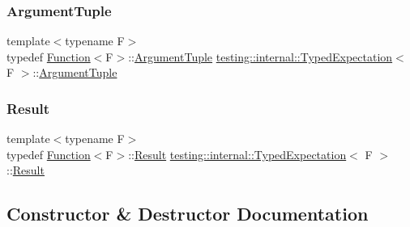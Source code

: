 \subsubsection{\texorpdfstring{Argument\+Tuple}{ArgumentTuple}}
{\footnotesize\ttfamily template$<$typename F$>$ \\
typedef \hyperlink{structtesting_1_1internal_1_1_function}{Function}$<$F$>$\+::\hyperlink{classtesting_1_1internal_1_1_typed_expectation_a9a91379262d101f435809ba4556d14fa}{Argument\+Tuple} \hyperlink{classtesting_1_1internal_1_1_typed_expectation}{testing\+::internal\+::\+Typed\+Expectation}$<$ F $>$\+::\hyperlink{classtesting_1_1internal_1_1_typed_expectation_a9a91379262d101f435809ba4556d14fa}{Argument\+Tuple}}

\mbox{\label{classtesting_1_1internal_1_1_typed_expectation_a6503597ee9d5ec940bfe8e51832b2422}} 
\subsubsection{\texorpdfstring{Result}{Result}}
{\footnotesize\ttfamily template$<$typename F$>$ \\
typedef \hyperlink{structtesting_1_1internal_1_1_function}{Function}$<$F$>$\+::\hyperlink{classtesting_1_1internal_1_1_typed_expectation_a6503597ee9d5ec940bfe8e51832b2422}{Result} \hyperlink{classtesting_1_1internal_1_1_typed_expectation}{testing\+::internal\+::\+Typed\+Expectation}$<$ F $>$\+::\hyperlink{classtesting_1_1internal_1_1_typed_expectation_a6503597ee9d5ec940bfe8e51832b2422}{Result}}



\subsection{Constructor \& Destructor Documentation}
\mbox{\label{classtesting_1_1internal_1_1_typed_expectation_a10bd0a8fa0db37215be42e1c61ccbc28}} 
